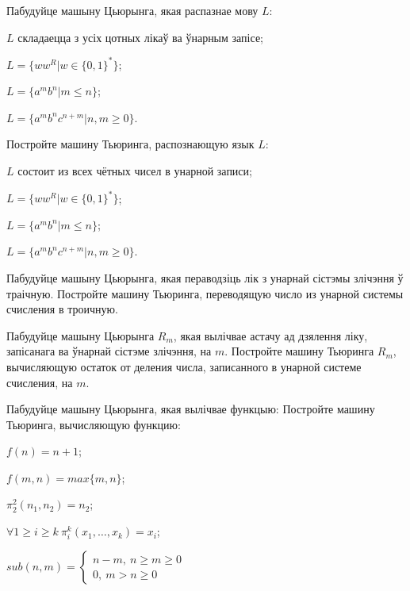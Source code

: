 \documentclass[12pt, a4paper]{article}
\begin{document}
\begin{problemList}
\problemItemSimple
{%
Пабудуйце машыну Цьюрынга, якая распазнае мову $L$:
\begin{belarusianEnumerate}
    \item $L$ складаецца з усіх цотных лікаў ва ўнарным запісе;
    \item $L=\{ww^R|w\in\{0, 1\}^*\}$;
    \item $L=\{a^mb^n|m\le n\}$;
    \item $L=\{a^mb^nc^{n+m}|n, m\ge 0\}$.
\end{belarusianEnumerate}
}
{%
Постройте машину Тьюринга, распознающую язык $L$:
\begin{russianEnumerate}
    \item $L$ состоит из всех чётных чисел в унарной записи;
    \item $L=\{ww^R|w\in\{0, 1\}^*\}$;
    \item $L=\{a^mb^n|m\le n\}$;
    \item $L=\{a^mb^nc^{n+m}|n, m\ge 0\}$.
\end{russianEnumerate}
}

\bigskip

\problemItemSimple
{Пабудуйце машыну Цьюрынга, якая пераводзіць лік з унарнай сістэмы злічэння ў траічную.}
{Постройте машину Тьюринга, переводящую число из унарной системы счисления в троичную.}

\bigskip

\problemItemSimple
{Пабудуйце машыну Цьюрынга $R_m$, якая вылічвае астачу ад дзялення ліку,
запісанага ва ўнарнай сістэме злічэння, на $m$.}
{Постройте машину Тьюринга $R_m$, вычисляющую остаток от деления числа,
записанного в унарной системе счисления, на $m$.}

\bigskip
 
\problemItemWithCommonPart
{Пабудуйце машыну Цьюрынга, якая вылічвае функцыю:}
{Постройте машину Тьюринга, вычисляющую функцию:}
{%
\begin{belarusianEnumerate}
    \item $f(n)=n+1$;
    \item $f(m, n)=max\{m, n\}$;
    \item $\pi_2^2(n_1, n_2)=n_2$;
    \item $\forall 1\ge i \ge k\ \pi_{i}^k(x_1, \ldots, x_k)=x_i$;
    \item $sub(n, m)=
    \begin{cases}
        n-m,\ n\ge m \ge 0\\
        0,\ m > n \ge 0
    \end{cases}$
\end{belarusianEnumerate}
}


\end{problemList}
\end{document}
